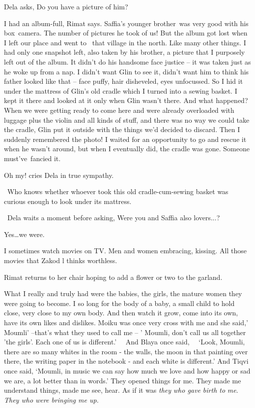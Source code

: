 \documentclass[letterpaper]{article}
\begin{document}
Dela asks, {\textquotedbl}Do you have a picture of him?{\textquotedbl}

{\textquotedbl}I had an album-full,{\textquotedbl} Rimat says. {\textquotedbl}Saffia's younger brother~was very good
with his box~camera. The number of pictures he took of us! But the album got lost when I left our place and went to
\ that village in the north. Like many other things. I had only one snapshot left, also taken by his brother, a picture
that I purposely left out of the album. It didn't do his handsome face justice -- it was taken just as he woke up from
a nap. I didn't want Glin to see it, didn't want him to think his father looked like that -- face puffy, hair
disheveled, eyes unfocussed. So I hid it under the mattress of Glin's old cradle which I turned into a sewing basket. I
kept it there and looked at it only when Glin wasn't there. And what happened? When we were getting ready to come here
and were already overloaded with luggage plus the violin and all kinds of stuff, and there was no way we could take the
cradle, Glin put it outside with the things we'd decided to discard. Then I suddenly remembered the photo! I waited for
an opportunity to go and rescue it when he wasn't around, but when I eventually did, the cradle was gone. Someone
must've~fancied it.{\textquotedbl}

{\textquotedbl}Oh my!{\textquotedbl} cries Dela in true sympathy.

~{\textquotedbl}Who knows whether whoever took this old cradle-cum-sewing basket was curious enough to look under its
mattress.{\textquotedbl}

~Dela waits a moment before asking, {\textquotedbl}Were you and Saffia also lovers...?{\textquotedbl}

{\textquotedbl}Yes{\dots}we were.{\textquotedbl}

{\textquotedbl}I sometimes watch movies on TV. Men and women embracing, kissing. All those movies that Zakod l thinks
worthless.{\textquotedbl}

Rimat returns to her chair hoping to add a flower or two to the garland.

{\textquotedbl}What I really and truly had were the babies, the girls, the mature women they were going to become. I so
long for the body of a baby, a small child to hold close, very close to my own body. And then watch it grow, come into
its own, have its own likes and dislikes. Moiku was once very cross with me and she said,' Moumli' --that's what they
used to call me -- ' Moumli, don't call us all together 'the girls'. Each one of us is different.' \ \ And Blaya once
said, \ \ {}`Look, Moumli, there are so many whites in the room - the walls, the moon in that painting over there, the
writing paper in the notebook - and each white is different.' And Tiqvi once said, `Moumli, in music we can say how
much we love and how happy or sad we are, a lot better than in words.' They opened things for me. They made me
understand things, made me see, hear. As if it was \textit{they} \textit{who gave birth to} \textit{me}.\textit{ They
who were bringing me up.}{\textquotedbl}
\end{document}
